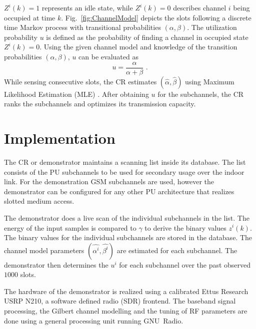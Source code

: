 \documentclass[conference,a4paper]{IEEEtran}
\begin{document}
$Z^i(k) = 1$ represents an idle state, while $Z^i(k) = 0$ describes channel $i$ being
occupied at time $k$.
Fig.~\ref{fig:ChannelModel} depicts the slots following a discrete time Markov
process with transitional probabilities $(\alpha, \beta)$. 
The utilization probability $u$ is defined as the probability of finding a channel in occupied state $Z^i(k) = 0$.
Using the given channel model and knowledge of the transition probabilities $(\alpha, \beta)$, $u$ can be evaluated as
\begin{equation} 
        u = \frac{\alpha}{\alpha + \beta} \text{~.}
\label{eq:chauti2}
\end{equation}
While sensing consecutive slots, the CR estimates $(\widehat{\alpha}, \widehat{\beta})$
using Maximum Likelihood Estimation (MLE) \cite{Long}. After
obtaining $u$ for the subchannels, the CR ranks the subchannels and optimizes
its transmission capacity.
\section{Implementation} \label{sec:imple} 
The CR or demonstrator maintains a scanning list inside its database. The
list consists of the PU subchannels to be used for secondary usage over the
indoor link.
For the demonstration GSM subchannels are used, however the
demonstrator can be configured for any other PU architecture that realizes slotted
medium access.

The demonstrator does a live scan of the individual subchannels
in the list. The energy of the input samples is compared 
to $\gamma$ to derive the binary values $z^i(k)$.
The binary values for the individual subchannels are stored in the database.
The channel model parameters
$(\widehat{\alpha^i}, \widehat{\beta^i})$ are estimated for each subchannel.
The demonstrator then determines the $u^i$ for each subchannel over the past observed $1000$ slots.

The hardware of the demonstrator is realized using a calibrated Ettus Research USRP N210, a
software defined radio (SDR) frontend.
The baseband signal processing, the Gilbert channel
modelling and the tuning of RF parameters are done using a general processing unit running
GNU~Radio.
\end{document}
